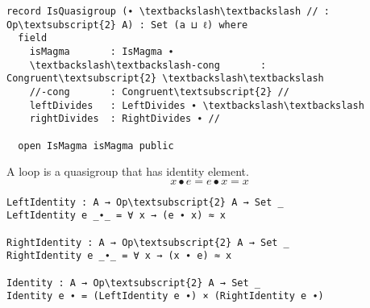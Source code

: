 \begin{Verbatim}[commandchars=\\\{\},samepage=true]
record IsQuasigroup (∙ \textbackslash\textbackslash // : Op\textsubscript{2} A) : Set (a ⊔ ℓ) where
  field
    isMagma       : IsMagma ∙
    \textbackslash\textbackslash-cong       : Congruent\textsubscript{2} \textbackslash\textbackslash
    //-cong       : Congruent\textsubscript{2} //
    leftDivides   : LeftDivides ∙ \textbackslash\textbackslash
    rightDivides  : RightDivides ∙ //

  open IsMagma isMagma public
\end{Verbatim}
\begin{comment}
  \textbackslash\textbackslash-cong\textsuperscript{l} : LeftCongruent \textbackslash\textbackslash
  \textbackslash\textbackslash-cong\textsuperscript{l} y≈z = \textbackslash\textbackslash-cong refl y≈z

  \textbackslash\textbackslash-cong\textsuperscript{r} : RightCongruent \textbackslash\textbackslash
  \textbackslash\textbackslash-cong\textsuperscript{r} y≈z = \textbackslash\textbackslash-cong y≈z refl

  //-cong\textsuperscript{l} : LeftCongruent //
  //-cong\textsuperscript{l} y≈z = //-cong refl y≈z

  //-cong\textsuperscript{r} : RightCongruent //
  //-cong\textsuperscript{r} y≈z = //-cong y≈z refl

  leftDivides\textsuperscript{l} : LeftDivides\textsuperscript{l} ∙ \textbackslash\textbackslash
  leftDivides\textsuperscript{l} = proj\textsubscript{1} leftDivides

  leftDivides\textsuperscript{r} : LeftDivides\textsuperscript{r} ∙ \textbackslash\textbackslash
  leftDivides\textsuperscript{r} = proj\textsubscript{2} leftDivides

  rightDivides\textsuperscript{l} : RightDivides\textsuperscript{l} ∙ //
  rightDivides\textsuperscript{l} = proj\textsubscript{1} rightDivides

  rightDivides\textsuperscript{r} : RightDivides\textsuperscript{r} ∙ //
  rightDivides\textsuperscript{r} = proj\textsubscript{2} rightDivides
\end{comment}

A loop is a quasigroup that has identity element.
\begin{equation}\label{eq_lineslope}
x ∙ e = e ∙ x = x
\end{equation}

\begin{Verbatim}[commandchars=\\\{\},samepage=true]
LeftIdentity : A → Op\textsubscript{2} A → Set _
LeftIdentity e _∙_ = ∀ x → (e ∙ x) ≈ x

RightIdentity : A → Op\textsubscript{2} A → Set _
RightIdentity e _∙_ = ∀ x → (x ∙ e) ≈ x

Identity : A → Op\textsubscript{2} A → Set _
Identity e ∙ = (LeftIdentity e ∙) × (RightIdentity e ∙)
\end{Verbatim}

